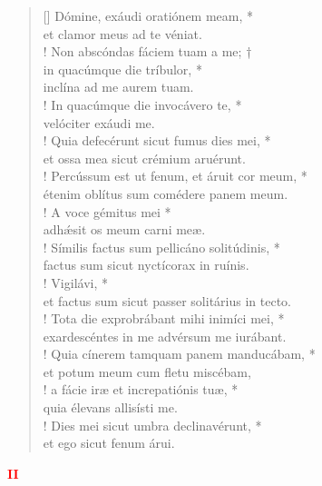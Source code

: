 \begin{verse}[\versewidth]
Dómine, exáudi oratiónem meam, *\\
et clamor meus ad te véniat.\\!
\vin Non abscóndas fáciem tuam a me; †\\
\vin in quacúmque die tríbulor, *\\
\vin inclína ad me aurem tuam.\\!
In quacúmque die invocávero te, *\\
velóciter exáudi me.\\!
\vin Quia defecérunt sicut fumus dies mei, *\\
\vin et ossa mea sicut crémium aruérunt.\\!
Percússum est ut fenum, et áruit cor meum, *\\
étenim oblítus sum comédere panem meum.\\!
\vin A voce gémitus mei *\\
\vin adh\'{æ}sit os meum carni meæ.\\!
Símilis factus sum pellicáno solitúdinis, *\\
factus sum sicut nyctícorax in ruínis.\\!
\vin Vigilávi, *\\
\vin et factus sum sicut passer solitárius in tecto.\\!
Tota die exprobrábant mihi inimíci mei, *\\
exardescéntes in me advérsum me iurábant.\\!
\vin Quia cínerem tamquam panem manducábam, *\\
\vin et potum meum cum fletu miscébam,\\!
a fácie iræ et increpatiónis tuæ, *\\
quia élevans allisísti me.\\!
\vin Dies mei sicut umbra declinavérunt, *\\
\vin et ego sicut fenum árui.\\
\end{verse}
\begin{center}
\textcolor{red}{\bf II}
\end{center}
